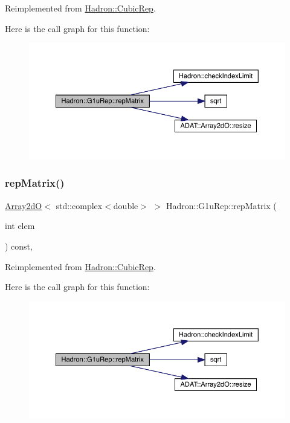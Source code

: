 Reimplemented from \mbox{\hyperlink{structHadron_1_1CubicRep_ac5d7e9e6f4ab1158b5fce3e4ad9e8005}{Hadron\+::\+Cubic\+Rep}}.

Here is the call graph for this function\+:
\nopagebreak
\begin{figure}[H]
\begin{center}
\leavevmode
\includegraphics[width=350pt]{d8/d42/structHadron_1_1G1uRep_a0f295ec0cd03014d647fa952f2c67676_cgraph}
\end{center}
\end{figure}
\mbox{\label{structHadron_1_1G1uRep_a0f295ec0cd03014d647fa952f2c67676}} 
\subsubsection{\texorpdfstring{repMatrix()}{repMatrix()}\hspace{0.1cm}{\footnotesize\ttfamily [2/2]}}
{\footnotesize\ttfamily \mbox{\hyperlink{classADAT_1_1Array2dO}{Array2dO}}$<$ std\+::complex$<$double$>$ $>$ Hadron\+::\+G1u\+Rep\+::rep\+Matrix (\begin{DoxyParamCaption}\item[{int}]{elem }\end{DoxyParamCaption}) const\hspace{0.3cm}{\ttfamily [inline]}, {\ttfamily [virtual]}}



Reimplemented from \mbox{\hyperlink{structHadron_1_1CubicRep_ac5d7e9e6f4ab1158b5fce3e4ad9e8005}{Hadron\+::\+Cubic\+Rep}}.

Here is the call graph for this function\+:
\nopagebreak
\begin{figure}[H]
\begin{center}
\leavevmode
\includegraphics[width=350pt]{d8/d42/structHadron_1_1G1uRep_a0f295ec0cd03014d647fa952f2c67676_cgraph}
\end{center}
\end{figure}


